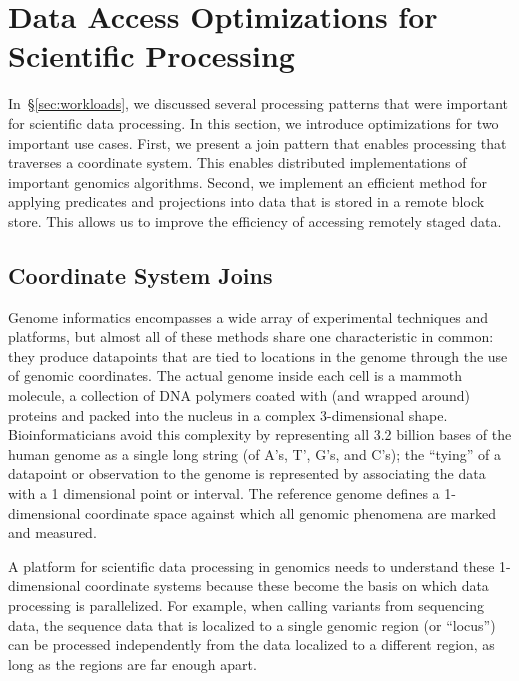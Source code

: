 \documentclass{acm_proc_article-sp}
\begin{document}
\section{Data Access Optimizations for \\ Scientific Processing}
\label{sec:optimizations-scientific-processing}

In~\S\ref{sec:workloads}, we discussed several processing patterns that were important for scientific
data processing. In this section, we introduce optimizations for two important use cases. First, we present
a join pattern that enables processing that traverses a coordinate system. This enables distributed
implementations of important genomics algorithms. Second, we implement an efficient method for
applying predicates and projections into data that is stored in a remote block store. This allows us to
improve the efficiency of accessing remotely staged data.

\subsection{Coordinate System Joins}
\label{sec:coordinate-system-joins}

Genome informatics encompasses a wide array of experimental techniques and platforms, but almost all
of these methods share one characteristic in common: they produce datapoints that are tied to
locations in the genome through the use of genomic coordinates. The actual genome inside each cell is a
mammoth molecule, a collection of DNA polymers coated with (and wrapped around) proteins and
packed into the nucleus in a complex 3-dimensional shape. Bioinformaticians avoid this complexity by
representing all 3.2 billion bases of the human genome as a single long string (of A's, T', G's, and C's);
the ``tying'' of a datapoint or observation to the genome is represented by associating the data with a 1
dimensional point or interval. The reference genome defines a 1-dimensional coordinate space against
which all genomic phenomena are marked and measured.

A platform for scientific data processing in genomics needs to understand these 1-dimensional coordinate
systems because these become the basis on which data processing is parallelized. For example, when
calling variants from sequencing data, the sequence data that is localized to a single genomic region
(or ``locus'') can be processed independently from the data localized to a different region, as long as the
regions are far enough apart.
\end{document}
